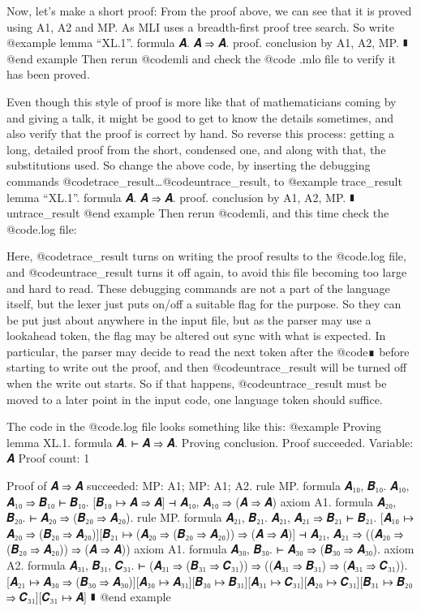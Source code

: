 Now, let's make a short proof: From the proof above, we can see that it is proved using A1, A2 and MP. As MLI uses a breadth-first proof tree search. So write
@example
lemma “XL.1”. formula 𝑨. 𝑨 ⇒ 𝑨.
proof.
  conclusion by A1, A2, MP.
∎
@end example
Then rerun @code{mli} and check the @code {.mlo} file to verify it has been proved.

Even though this style of proof is more like that of mathematicians coming by and giving a talk, it might be good to get to know the details sometimes, and also verify that the proof is correct by hand. So reverse this process: getting a long, detailed proof from the short, condensed one, and along with that, the substitutions used. So change the above code, by inserting the debugging commands @code{trace_result}…@code{untrace_result}, to
@example
trace_result
lemma “XL.1”. formula 𝑨. 𝑨 ⇒ 𝑨.
proof.
  conclusion by A1, A2, MP.
∎
untrace_result
@end example
Then rerun @code{mli}, and this time check the @code{.log} file:

Here, @code{trace_result} turns on writing the proof results to the @code{.log} file, and @code{untrace_result} turns it off again, to avoid this file becoming too large and hard to read. These debugging commands are not a part of the language itself, but the lexer just puts on/off a suitable flag for the purpose. So they can be put just about anywhere in the input file, but as the parser may use a lookahead token, the flag may be altered out sync with what is expected. In particular, the parser may decide to read the next token after the @code{∎} before starting to write out the proof, and then @code{untrace_result} will be turned off when the write out starts. So if that happens, @code{untrace_result} must be moved to a later point in the input code, one language token should suffice.

The code in the @code{.log} file looks something like this:
@example
Proving lemma XL.1. formula 𝑨.
  ⊢ 𝑨 ⇒ 𝑨.
Proving conclusion.
Proof succeeded.
Variable: 𝑨
Proof count: 1

Proof of
  𝑨 ⇒ 𝑨
succeeded:
  MP: A1; MP: A1; A2.
rule MP. formula 𝑨₁₀, 𝑩₁₀.
  𝑨₁₀, 𝑨₁₀ ⇒ 𝑩₁₀ ⊢ 𝑩₁₀.
[𝑩₁₀ ↦ 𝑨 ⇒ 𝑨]
 ⊣ 𝑨₁₀, 𝑨₁₀ ⇒ (𝑨 ⇒ 𝑨)
axiom A1. formula 𝑨₂₀, 𝑩₂₀.
  ⊢ 𝑨₂₀ ⇒ (𝑩₂₀ ⇒ 𝑨₂₀).
rule MP. formula 𝑨₂₁, 𝑩₂₁.
  𝑨₂₁, 𝑨₂₁ ⇒ 𝑩₂₁ ⊢ 𝑩₂₁.
[𝑨₁₀ ↦ 𝑨₂₀ ⇒ (𝑩₂₀ ⇒ 𝑨₂₀)][𝑩₂₁ ↦ (𝑨₂₀ ⇒ (𝑩₂₀ ⇒ 𝑨₂₀)) ⇒ (𝑨 ⇒ 𝑨)]
 ⊣ 𝑨₂₁, 𝑨₂₁ ⇒ ((𝑨₂₀ ⇒ (𝑩₂₀ ⇒ 𝑨₂₀)) ⇒ (𝑨 ⇒ 𝑨))
axiom A1. formula 𝑨₃₀, 𝑩₃₀.
  ⊢ 𝑨₃₀ ⇒ (𝑩₃₀ ⇒ 𝑨₃₀).
axiom A2. formula 𝑨₃₁, 𝑩₃₁, 𝑪₃₁.
  ⊢ (𝑨₃₁ ⇒ (𝑩₃₁ ⇒ 𝑪₃₁)) ⇒ ((𝑨₃₁ ⇒ 𝑩₃₁) ⇒ (𝑨₃₁ ⇒ 𝑪₃₁)).
[𝑨₂₁ ↦ 𝑨₃₀ ⇒ (𝑩₃₀ ⇒ 𝑨₃₀)][𝑨₃₀ ↦ 𝑨₃₁][𝑩₃₀ ↦ 𝑩₃₁][𝑨₃₁ ↦ 𝑪₃₁][𝑨₂₀ ↦ 𝑪₃₁][𝑩₃₁ ↦ 𝑩₂₀ ⇒ 𝑪₃₁][𝑪₃₁ ↦ 𝑨]
∎
@end example


